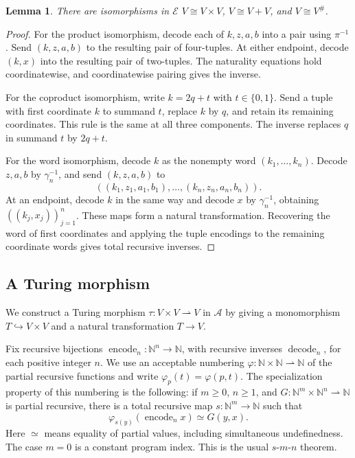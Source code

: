 \documentclass[11pt]{article}
\newtheorem{lemma}[theorem]{Lemma}
\newcommand{\N}{\mathbb N}
\begin{document}
\begin{lemma}\label{lem:fork-frames}
There are isomorphisms in $\mathcal E$
$V\cong V\times V$, $V\cong V+V$, and $V\cong V^\#$.
\end{lemma}
\begin{proof}
For the product isomorphism, decode each of $k,z,a,b$ into a
pair using $\pi^{-1}$. Send $(k,z,a,b)$ to the resulting pair
of four-tuples. At either endpoint, decode $(k,x)$ into the
resulting pair of two-tuples. The naturality equations hold
coordinatewise, and coordinatewise pairing gives the inverse.

For the coproduct isomorphism, write $k=2q+t$ with
$t\in\{0,1\}$. Send a tuple with first coordinate $k$ to
summand $t$, replace $k$ by $q$, and retain its remaining
coordinates. This rule is the same at all three components.
The inverse replaces $q$ in summand $t$ by $2q+t$.

For the word isomorphism, decode $k$ as the nonempty word
$(k_1,\ldots,k_n)$. Decode $z,a,b$ by $\gamma_n^{-1}$,
and send $(k,z,a,b)$ to
\[
 ((k_1,z_1,a_1,b_1),\ldots,(k_n,z_n,a_n,b_n)).
\]
At an endpoint, decode $k$ in the same way and decode $x$
by $\gamma_n^{-1}$, obtaining $((k_j,x_j))_{j=1}^n$.
These maps form a natural transformation. Recovering the word of
first coordinates and applying the tuple encodings to the
remaining coordinate words gives total recursive inverses.
\end{proof}

\subsection{A Turing morphism}\label{app:fork-turing}

We construct a Turing morphism $\tau:V\times V\rightharpoonup V$
in $\mathcal A$ by giving a monomorphism $T\hookrightarrow V\times V$
and a natural transformation $T\to V$.

Fix recursive bijections
$\operatorname{encode}_n:\N^n\to\N$, with recursive inverses
$\operatorname{decode}_n$, for each positive integer $n$.
We use an acceptable numbering
$\varphi:\N\times\N\rightharpoonup\N$ of the partial recursive
functions and write $\varphi_p(t)=\varphi(p,t)$.
The specialization property of this numbering is the following:
if $m\geq0$, $n\geq1$, and
$G:\N^m\times\N^n\rightharpoonup\N$ is partial recursive,
there is a total recursive map $s:\N^m\to\N$ such that
\[
 \varphi_{s(y)}(\operatorname{encode}_n x)\simeq G(y,x).
\]
Here $\simeq$ means equality of partial values,
including simultaneous undefinedness. The case $m=0$ is a
constant program index. This is the usual $s$-$m$-$n$ theorem.
\end{document}
